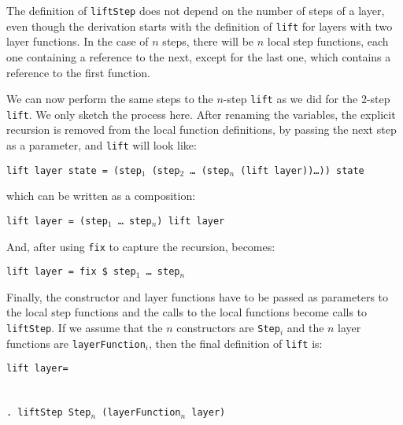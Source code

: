 The definition of \texttt{liftStep} does not depend on the number of steps of a layer, even though the derivation starts with the definition of \texttt{lift} for layers with two layer functions. In the case of $n$ steps, there will be $n$ local step functions, each one containing a reference to the next, except for the last one, which contains a reference to the first function. 

We can now perform the same steps to the $n$-step \texttt{lift} as we did for the 2-step \texttt{lift}. We only sketch the process here. After renaming the variables, the explicit recursion is removed from the local function definitions, by passing the next step as a parameter, and \texttt{lift} will look like:

\begin{tabbing}
{\tt l}\={\tt ift layer state = (step$_1$ (step$_2$ \dots ~(step$_n$ (lift layer))\dots)) state}\\
\end{tabbing}

which can be written as a composition:

\begin{tabbing}
{\tt l}\={\tt ift layer = (step$_1$ \dots ~step$_n$) lift layer}\\
\end{tabbing}

And, after using \texttt{fix} to capture the recursion, becomes:

\begin{tabbing}
{\tt l}\={\tt ift layer = fix \$ step$_1$ \dots ~step$_n$}\\
\end{tabbing}

Finally, the constructor and layer functions have to be passed as parameters to the local step functions and the calls to the local functions become calls to \texttt{liftStep}. If we assume that the $n$ constructors are \texttt{Step$_i$} and the $n$ layer functions are \texttt{layerFunction$_i$}, then the final definition of \texttt{lift} is:\begin{tabbing}
{\tt li}\={\tt ft l}\={\tt ayer= }\\
\\
\>\\ 
\>\>\verb|. lift|{\tt Step Step$_n$ (layerFunction$_n$ layer)}
\end{tabbing}

